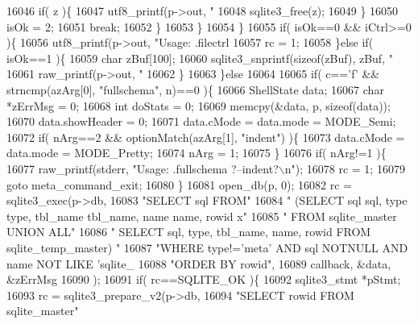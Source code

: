 \begin{DoxyCode}
{{{{{{{{{{{{{{{{{16046           \textcolor{keywordflow}{if}( z )\{
16047             utf8_printf(p->out, \textcolor{stringliteral}{"%
16048             sqlite3_free(z);
16049           \}
16050           isOk = 2;
16051           \textcolor{keywordflow}{break};
16052         \}
16053       \}
16054     \}
16055     \textcolor{keywordflow}{if}( isOk==0 && iCtrl>=0 )\{
16056       utf8_printf(p->out, \textcolor{stringliteral}{"Usage: .filectrl %
16057       rc = 1;
16058     \}\textcolor{keywordflow}{else} \textcolor{keywordflow}{if}( isOk==1 )\{
16059       \textcolor{keywordtype}{char} zBuf[100];
16060       sqlite3_snprintf(\textcolor{keyword}{sizeof}(zBuf), zBuf, \textcolor{stringliteral}{"%
16061       raw_printf(p->out, \textcolor{stringliteral}{"%
16062     \}
16063   \}\textcolor{keywordflow}{else}
16064 
16065   \textcolor{keywordflow}{if}( c==\textcolor{charliteral}{'f'} && strncmp(azArg[0], \textcolor{stringliteral}{"fullschema"}, n)==0 )\{
16066     ShellState data;
16067     \textcolor{keywordtype}{char} *zErrMsg = 0;
16068     \textcolor{keywordtype}{int} doStats = 0;
16069     memcpy(&data, p, \textcolor{keyword}{sizeof}(data));
16070     data.showHeader = 0;
16071     data.cMode = data.mode = MODE_Semi;
16072     \textcolor{keywordflow}{if}( nArg==2 && optionMatch(azArg[1], \textcolor{stringliteral}{"indent"}) )\{
16073       data.cMode = data.mode = MODE_Pretty;
16074       nArg = 1;
16075     \}
16076     \textcolor{keywordflow}{if}( nArg!=1 )\{
16077       raw_printf(stderr, \textcolor{stringliteral}{"Usage: .fullschema ?--indent?\(\backslash\)n"});
16078       rc = 1;
16079       \textcolor{keywordflow}{goto} meta\_command\_exit;
16080     \}
16081     open_db(p, 0);
16082     rc = sqlite3_exec(p->db,
16083        \textcolor{stringliteral}{"SELECT sql FROM"}
16084        \textcolor{stringliteral}{"  (SELECT sql sql, type type, tbl\_name tbl\_name, name name, rowid x"}
16085        \textcolor{stringliteral}{"     FROM sqlite\_master UNION ALL"}
16086        \textcolor{stringliteral}{"   SELECT sql, type, tbl\_name, name, rowid FROM sqlite\_temp\_master) "}
16087        \textcolor{stringliteral}{"WHERE type!='meta' AND sql NOTNULL AND name NOT LIKE 'sqlite\_%
16088        \textcolor{stringliteral}{"ORDER BY rowid"},
16089        callback, &data, &zErrMsg
16090     );
16091     \textcolor{keywordflow}{if}( rc==SQLITE_OK )\{
16092       sqlite3_stmt *pStmt;
16093       rc = sqlite3_prepare_v2(p->db,
16094                \textcolor{stringliteral}{"SELECT rowid FROM sqlite\_master"}
}}}}}}}}}}}}}}}}}}}}}}
\end{DoxyCode}
